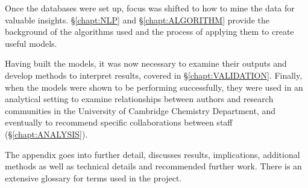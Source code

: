 Once the databases were set up, focus was shifted to how to mine the data for valuable insights. \S\ref{chapt:NLP} and \S\ref{chapt:ALGORITHM} provide the background of the algorithms used and the process of applying them to create useful models. 

Having built the models, it was now necessary to examine their outputs and develop methods to interpret results, covered in \S\ref{chapt:VALIDATION}. Finally, when the models were shown to be performing successfully, they were used in an analytical setting to examine relationships between authors and research communities in the University of Cambridge Chemistry Department, and eventually to recommend specific collaborations between staff (\S\ref{chapt:ANALYSIS}).

The appendix goes into further detail, discusses results, implications, additional methods as well as technical details and recommended further work. There is an extensive glossary for terms used in the project.